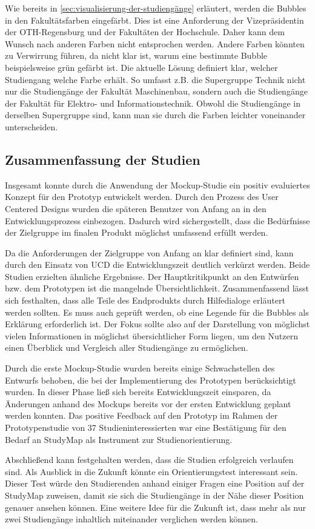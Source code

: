 Wie bereits in \autoref{sec:visualisierung-der-studiengänge} erläutert, werden die Bubbles in den Fakultätsfarben eingefärbt. Dies ist eine Anforderung der Vizepräsidentin der OTH-Regensburg und der Fakultäten der Hochschule. Daher kann dem Wunsch nach anderen Farben nicht entsprochen werden. Andere Farben könnten zu Verwirrung führen, da nicht klar ist, warum eine bestimmte Bubble beispielsweise grün gefärbt ist. Die aktuelle Lösung definiert klar, welcher Studiengang welche Farbe erhält. So umfasst z.B. die Supergruppe Technik nicht nur die Studiengänge der Fakultät Maschinenbau, sondern auch die Studiengänge der Fakultät für Elektro- und Informationstechnik. Obwohl die Studiengänge in derselben Supergruppe sind, kann man sie durch die Farben leichter voneinander unterscheiden.

\subsection{Zusammenfassung der Studien}
Insgesamt konnte durch die Anwendung der Mockup-Studie ein positiv evaluiertes Konzept für den Prototyp entwickelt werden. Durch den Prozess des User Centered Designs wurden die späteren Benutzer von Anfang an in den Entwicklungsprozess einbezogen. Dadurch wird sichergestellt, dass die Bedürfnisse der Zielgruppe im finalen Produkt möglichst umfassend erfüllt werden.

Da die Anforderungen der Zielgruppe von Anfang an klar definiert sind, kann durch den Einsatz von UCD die Entwicklungszeit deutlich verkürzt werden. Beide Studien erzielten ähnliche Ergebnisse. Der Hauptkritikpunkt an den Entwürfen bzw. dem Prototypen ist die mangelnde Übersichtlichkeit. Zusammenfassend lässt sich festhalten, dass alle Teile des Endprodukts durch Hilfedialoge erläutert werden sollten. Es muss auch geprüft werden, ob eine Legende für die Bubbles als Erklärung erforderlich ist. Der Fokus sollte also auf der Darstellung von möglichst vielen Informationen in möglichst übersichtlicher Form liegen, um den Nutzern einen Überblick und Vergleich aller Studiengänge zu ermöglichen.

Durch die erste Mockup-Studie wurden bereits einige Schwachstellen des Entwurfs behoben, die bei der Implementierung des Prototypen berücksichtigt wurden. In dieser Phase ließ sich bereits Entwicklungszeit einsparen, da Änderungen anhand des Mockups bereits vor der ersten Entwicklung geplant werden konnten. Das positive Feedback auf den Prototyp im Rahmen der Prototypenstudie von 37 Studieninteressierten war eine Bestätigung für den Bedarf an StudyMap als Instrument zur Studienorientierung.

Abschließend kann festgehalten werden, dass die Studien erfolgreich verlaufen sind. Als Ausblick in die Zukunft könnte ein Orientierungstest interessant sein. Dieser Test würde den Studierenden anhand einiger Fragen eine Position auf der StudyMap zuweisen, damit sie sich die Studiengänge in der Nähe dieser Position genauer ansehen können. Eine weitere Idee für die Zukunft ist, dass mehr als nur zwei Studiengänge inhaltlich miteinander verglichen werden können.